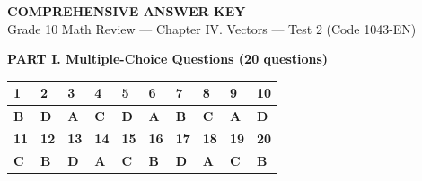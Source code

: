 \documentclass[10pt,a4paper]{article}
\begin{document}
\newpage
\pagestyle{dapan}
\setcounter{page}{1}

\begin{center}
  {\Large\bfseries\color{ink} COMPREHENSIVE ANSWER KEY}\\[2pt]
  {\small\color{gray!75!black} Grade 10 Math Review — Chapter IV. Vectors — Test 2 (Code 1043-EN)}
\end{center}
\vspace{1pt}

\noindent\textbf{PART I. Multiple-Choice Questions (20 questions)}
\vspace{1.5pt}

\begin{center}
\renewcommand{\arraystretch}{1.15}
\begin{tabular}{|C{0.95cm}|C{0.95cm}|C{0.95cm}|C{0.95cm}|C{0.95cm}|C{0.95cm}|C{0.95cm}|C{0.95cm}|C{0.95cm}|C{0.95cm}|}
\hline
\textbf{1} & \textbf{2} & \textbf{3} & \textbf{4} & \textbf{5} & \textbf{6} & \textbf{7} & \textbf{8} & \textbf{9} & \textbf{10} \\ \hline
\textbf{B} & \textbf{D} & \textbf{A} & \textbf{C} & \textbf{D} & \textbf{A} & \textbf{B} & \textbf{C} & \textbf{A} & \textbf{D} \\ \hline
\hline
\textbf{11} & \textbf{12} & \textbf{13} & \textbf{14} & \textbf{15} & \textbf{16} & \textbf{17} & \textbf{18} & \textbf{19} & \textbf{20} \\ \hline
\textbf{C} & \textbf{B} & \textbf{D} & \textbf{A} & \textbf{C} & \textbf{B} & \textbf{D} & \textbf{A} & \textbf{C} & \textbf{B} \\ \hline
\end{tabular}
\end{center}
\end{document}
